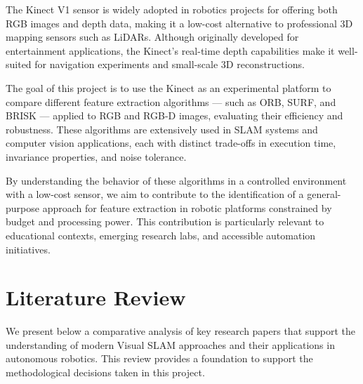\documentclass[a4paper,12pt]{article}
\begin{document}
The Kinect V1 sensor is widely adopted in robotics projects for offering both RGB images and depth data, making it a low-cost alternative to professional 3D mapping sensors such as LiDARs. Although originally developed for entertainment applications, the Kinect’s real-time depth capabilities make it well-suited for navigation experiments and small-scale 3D reconstructions.

The goal of this project is to use the Kinect as an experimental platform to compare different feature extraction algorithms — such as ORB, SURF, and BRISK — applied to RGB and RGB-D images, evaluating their efficiency and robustness. These algorithms are extensively used in SLAM systems and computer vision applications, each with distinct trade-offs in execution time, invariance properties, and noise tolerance.

By understanding the behavior of these algorithms in a controlled environment with a low-cost sensor, we aim to contribute to the identification of a general-purpose approach for feature extraction in robotic platforms constrained by budget and processing power. This contribution is particularly relevant to educational contexts, emerging research labs, and accessible automation initiatives.

\section{Literature Review}

We present below a comparative analysis of key research papers that support the understanding of modern Visual SLAM approaches and their applications in autonomous robotics. This review provides a foundation to support the methodological decisions taken in this project.
\end{document}

